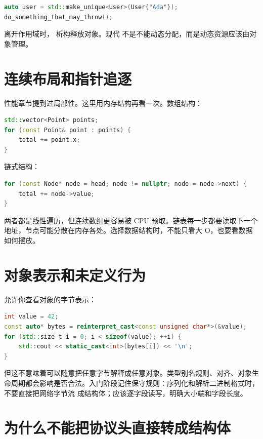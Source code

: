 \begin{lstlisting}[language=C++,caption={独占指针自动释放}]
auto user = std::make_unique<User>(User{"Ada"});
do_something_that_may_throw();
\end{lstlisting}

离开作用域时， 析构释放对象。现代 \cpp 不是不能动态分配，而是动态资源应该由对象管理。

\section{连续布局和指针追逐}

性能章节提到过局部性。这里用内存结构再看一次。数组结构：

\begin{lstlisting}[language=C++,caption={连续点数组}]
std::vector<Point> points;
for (const Point& point : points) {
    total += point.x;
}
\end{lstlisting}

链式结构：

\begin{lstlisting}[language=C++,caption={节点指针追逐}]
for (const Node* node = head; node != nullptr; node = node->next) {
    total += node->value;
}
\end{lstlisting}

两者都是线性遍历，但连续数组更容易被 CPU 预取。链表每一步都要读取下一个地址，节点可能分散在内存各处。选择数据结构时，不能只看大 O，也要看数据如何摆放。

\section{对象表示和未定义行为}

\cpp 允许你查看对象的字节表示：

\begin{lstlisting}[language=C++,caption={查看对象字节}]
int value = 42;
const auto* bytes = reinterpret_cast<const unsigned char*>(&value);
for (std::size_t i = 0; i < sizeof(value); ++i) {
    std::cout << static_cast<int>(bytes[i]) << '\n';
}
\end{lstlisting}

但这不意味着可以随意把任意字节解释成任意对象。类型别名规则、对齐、对象生命周期都会影响是否合法。入门阶段记住保守规则：序列化和解析二进制格式时，不要直接把网络字节流  成结构体；应该逐字段读写，明确大小端和字段长度。

\section{为什么不能把协议头直接转成结构体}

